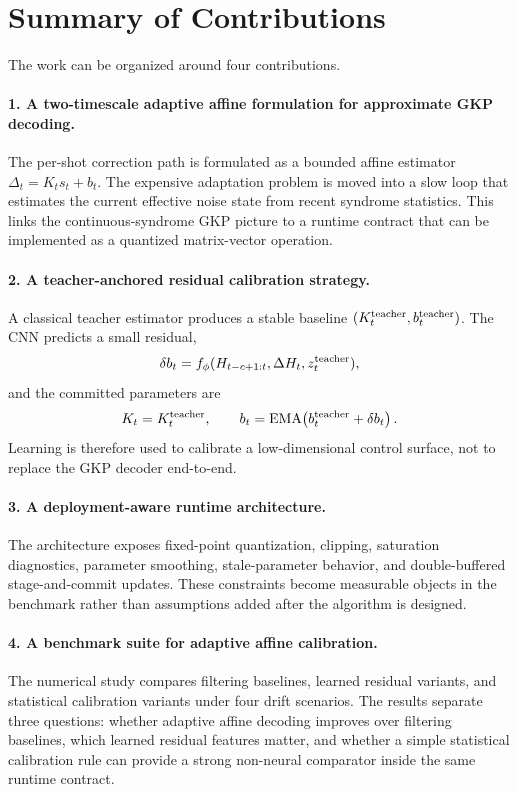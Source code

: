 \documentclass[11pt]{article}
\begin{document}
\section{Summary of Contributions}

The work can be organized around four contributions.

\paragraph{1. A two-timescale adaptive affine formulation for approximate GKP
decoding.}
The per-shot correction path is formulated as a bounded affine estimator
\(\Delta_t=K_t s_t+b_t\).  The expensive adaptation problem is moved into a
slow loop that estimates the current effective noise state from recent syndrome
statistics.  This links the continuous-syndrome GKP picture to a runtime
contract that can be implemented as a quantized matrix-vector operation.

\paragraph{2. A teacher-anchored residual calibration strategy.}
A classical teacher estimator produces a stable baseline
\((K_t^{\rm teacher},b_t^{\rm teacher})\).  The CNN predicts a small residual,
\begin{equation}
    \delta b_t=f_\phi(H_{t-c+1:t},\Delta H_t,z_t^{\rm teacher}),
\end{equation}
and the committed parameters are
\begin{equation}
    K_t=K_t^{\rm teacher}, \qquad
    b_t={\rm EMA}\!\left(b_t^{\rm teacher}+\delta b_t\right).
\end{equation}
Learning is therefore used to calibrate a low-dimensional control surface, not
to replace the GKP decoder end-to-end.

\paragraph{3. A deployment-aware runtime architecture.}
The architecture exposes fixed-point quantization, clipping, saturation
diagnostics, parameter smoothing, stale-parameter behavior, and double-buffered
stage-and-commit updates.  These constraints become measurable objects in the
benchmark rather than assumptions added after the algorithm is designed.

\paragraph{4. A benchmark suite for adaptive affine calibration.}
The numerical study compares filtering baselines, learned residual variants,
and statistical calibration variants under four drift scenarios.  The results
separate three questions: whether adaptive affine decoding improves over
filtering baselines, which learned residual features matter, and whether a
simple statistical calibration rule can provide a strong non-neural comparator
inside the same runtime contract.
\end{document}
